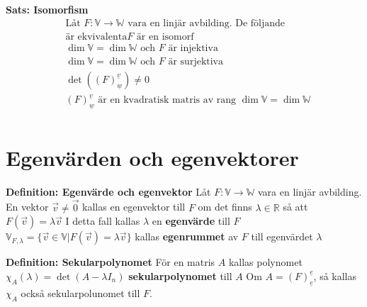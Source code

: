 \begin{multicols}{2}
\textbf{Sats: Isomorfism}
\begin{align*}
  &\text{Låt $F:\mathbb{V}\to\mathbb{W}$ vara en linjär avbilding. De följande} \\
  &\text{är ekvivalenta}F \text{ är en isomorf} \\
  &\dim{\mathbb{V}} = \dim{\mathbb{W}} \text{ och $F$ är injektiva} \\
  &\dim{\mathbb{V}} = \dim{\mathbb{W}} \text{ och $F$ är surjektiva} \\
  &\det({(F)}^{\underline{v}}_{\underline{w}}) \neq 0 \\
  &{(F)}^{\underline{v}}_{\underline{w}} \text{ är en kvadratisk matris av rang }
  \dim{\mathbb{V}} = \dim{\mathbb{W}} \\
\end{align*}




\section{Egenvärden och egenvektorer}
\textbf{Definition: Egenvärde och egenvektor}
Låt $F:\mathbb{V}\to\mathbb{W}$ vara en linjär avbilding.
En vektor $\vec{v}\neq\vec{0}$ kallas en egenvektor till $F$ om det finns $\lambda\in\mathbb{R}$ så att
$F(\vec{v}) = \lambda\vec{v}$
I detta fall kallas $\lambda$ en \textbf{egenvärde} till $F$
$\mathbb{V}_{F,\lambda} = \{ \vec{v}\in\mathbb{V} | F(\vec{v}) = \lambda\vec{v} \}$
kallas \textbf{egenrummet} av $F$ till egenvärdet $\lambda$

\textbf{Definition: Sekularpolynomet}
För en matris $A$ kallas polynomet $\chi_A(\lambda) = \det(A-\lambda I_n)$
\textbf{sekularpolynomet} till $A$
Om $A= {(F)}^{\underline{e}}_{\underline{e}}$, så kallas $\chi_A$ också
sekularpolunomet till $F$.


\end{multicols}
